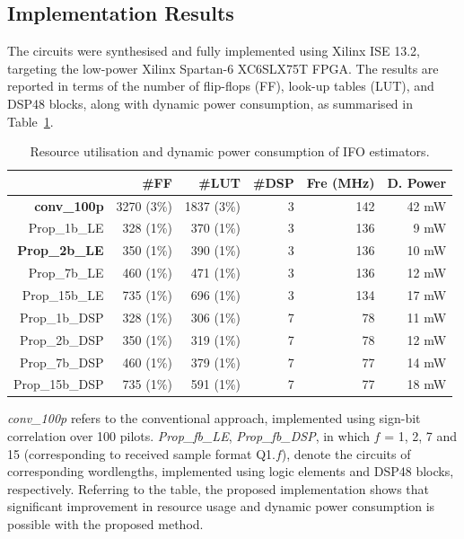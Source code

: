 \subsection{Implementation Results}
The circuits were synthesised and fully implemented using Xilinx ISE 13.2, targeting the low-power Xilinx Spartan-6 XC6SLX75T FPGA.
The results are reported in terms of the number of flip-flops (FF), look-up tables (LUT), and DSP48 blocks, along with dynamic power consumption, as summarised in Table~\ref{tab:Imp_Rpt}.
\begin{table}[h]
	\centering
	\caption{Resource utilisation and dynamic power consumption of IFO estimators.}
	\label{tab:Imp_Rpt}
	\renewcommand{\arraystretch}{1.2}

	\begin{tabular}{r|r|r|r|r|r}

       \hline \hline
    		  \makebox[1.1cm][c]{IFO est. Cir.} 	& \#FF & \#LUT  & \#DSP & Fre (MHz) & D. Power \\
    	\hline
		\textbf{conv\_100p}		& 3270 (3\%)	& 1837 (3\%)	& 3 &  142 	&  42	mW \\
		Prop\_1b\_LE			& 328 (1\%)		& 370 (1\%)		& 3 &  136 	&  9		mW\\
		\textbf{Prop\_2b\_LE}	& 350 (1\%)		& 390 (1\%)		& 3 &  136 	&  10 	mW\\
		Prop\_7b\_LE			& 460 (1\%)		& 471 (1\%)		& 3 &  136 	&  12 	mW\\
		Prop\_15b\_LE		      & 735 (1\%)		& 696 (1\%)		& 3 &  134 	&  17 	mW\\

		Prop\_1b\_DSP			& 328 (1\%)		& 306 (1\%)		& 7 &  78   	&  11 	mW\\
		Prop\_2b\_DSP			& 350 (1\%)		& 319 (1\%)		& 7 &  78   	&  12	mW\\
		Prop\_7b\_DSP			& 460 (1\%)		& 379 (1\%)		& 7 &  77   	&  14	mW\\
		Prop\_15b\_DSP			& 735 (1\%)		& 591 (1\%)		& 7 &  77 	&  18 	mW\\
    	\hline \hline
    \end{tabular}
\end{table}


\emph{conv\_100p} refers to the conventional approach, implemented using sign-bit correlation over 100 pilots.
\emph{Prop\_fb\_LE}, \emph{Prop\_fb\_DSP}, in which $f$ = 1, 2, 7 and 15 (corresponding to received sample format Q1.$f$), denote the circuits of corresponding wordlengths, implemented using logic elements and DSP48 blocks, respectively.
Referring to the table, the proposed implementation shows that significant improvement in resource usage and dynamic power consumption is possible with the proposed method.

